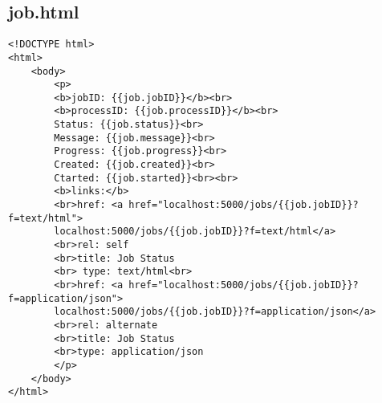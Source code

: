 \subsection{job.html}
\begin{lstlisting}[caption={job.html}, style = HTML]
<!DOCTYPE html>
<html>
    <body>
        <p>
        <b>jobID: {{job.jobID}}</b><br>
        <b>processID: {{job.processID}}</b><br>
        Status: {{job.status}}<br>
        Message: {{job.message}}<br>
        Progress: {{job.progress}}<br>
        Created: {{job.created}}<br>
        Ctarted: {{job.started}}<br><br>
        <b>links:</b>
        <br>href: <a href="localhost:5000/jobs/{{job.jobID}}?f=text/html">
        localhost:5000/jobs/{{job.jobID}}?f=text/html</a>
        <br>rel: self
        <br>title: Job Status
        <br> type: text/html<br>
        <br>href: <a href="localhost:5000/jobs/{{job.jobID}}?f=application/json">
        localhost:5000/jobs/{{job.jobID}}?f=application/json</a>
        <br>rel: alternate
        <br>title: Job Status
        <br>type: application/json
        </p>
    </body>
</html>
\end{lstlisting}\label{RessourceJobHTML}  

